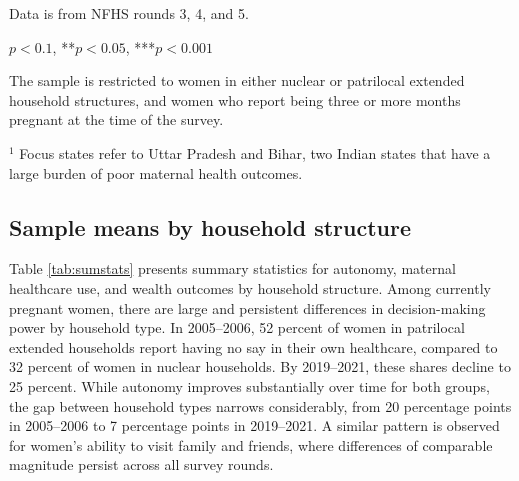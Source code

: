 \documentclass[12pt]{article}
\begin{document}
\begin{table}[!htbp]
    \centering
    \begin{threeparttable}[t]
        \caption{:  Proportion of pregnant women in patrilocal extended households is increasing among all subgroups}
        \label{tab:patrilocal_subgroups}

        \scriptsize
        \setlength{\tabcolsep}{6pt}
        \renewcommand{\arraystretch}{1.2}

        

        \begin{tablenotes}
            \item Data is from NFHS rounds 3, 4, and 5.
            \item *$p<0.1$, **$p<0.05$, ***$p<0.001$
            \item The sample is restricted to women in either nuclear or patrilocal extended household structures, and women who report being three or more months pregnant at the time of the survey.
            \item $^1$ Focus states refer to Uttar Pradesh and Bihar, two Indian states that have a large burden of poor maternal health outcomes.
        \end{tablenotes}
    \end{threeparttable}
\end{table}

\subsection{Sample means by household structure}

Table \ref{tab:sumstats} presents summary statistics for autonomy, maternal healthcare use, and wealth outcomes by household structure. Among currently pregnant women, there are large and persistent differences in decision-making power by household type. In 2005–2006, 52 percent of women in patrilocal extended households report having no say in their own healthcare, compared to 32 percent of women in nuclear households. By 2019–2021, these shares decline to 25 percent. While autonomy improves substantially over time for both groups, the gap between household types narrows considerably, from 20 percentage points in 2005–2006 to 7 percentage points in 2019–2021. A similar pattern is observed for women’s ability to visit family and friends, where differences of comparable magnitude persist across all survey rounds.
\end{document}
